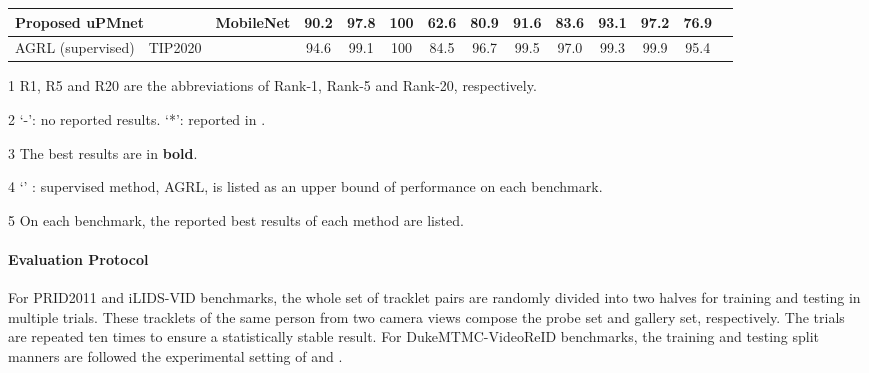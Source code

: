\documentclass{cta-author}
\begin{document}
\begin{table*}[!ht]
\begin{threeparttable}
\begin{tabular}{lccccccccccccc}
				\multicolumn{2}{l}{Proposed uPMnet}                                                              & MobileNet                  & 90.2                   & \textbf{97.8}          & 100                    & 62.6                            & 80.9                   & 91.6                   & \textbf{83.6}          & \textbf{93.1}          & \textbf{97.2}       & \textbf{76.9}           \\ \hline 
				AGRL\dag \cite{RN442} (supervised)                                  & TIP2020                    &                            & 94.6                   & 99.1                   & 100                    & 84.5                            & 96.7                   & 99.5                   & 97.0                   & 99.3                   & 99.9                & 95.4                    \\ \hline
			\end{tabular}
			\begin{tablenotes}
				\item[1] R1, R5 and R20 are the abbreviations of Rank-1, Rank-5 and Rank-20, respectively.
				\item[2] `-': no reported results. `*': reported in \cite{RN247}.
				\item[3] The best results are in \textbf{bold}. 
				\item[4] `\dag' : supervised method, AGRL, is listed as an upper bound of performance on each benchmark.
				\item[5] On each benchmark, the reported best results of each method are listed.
			\end{tablenotes}
		\end{threeparttable}
	\end{table*}
	
	\paragraph{Evaluation Protocol}
	For PRID2011 and iLIDS-VID benchmarks, the whole set of tracklet pairs are randomly divided into two halves for training and testing in multiple trials. These tracklets of the same person from two camera views compose the probe set and gallery set, respectively. The trials are repeated ten times to ensure a statistically stable result. For DukeMTMC-VideoReID benchmarks, the training and testing split manners are followed the experimental setting of \cite{RN391} and \cite{RN158}. 
	
\end{document}
